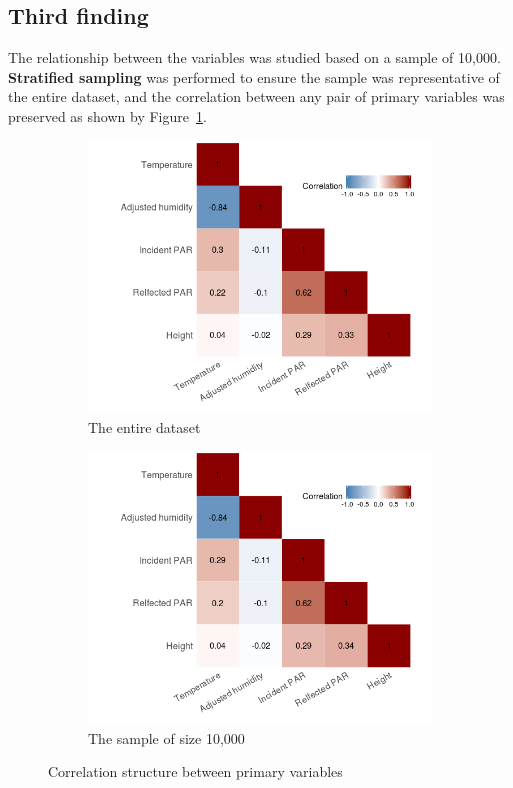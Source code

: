 \documentclass[11pt]{article}
\begin{document}
\subsection{Third finding}
\label{subsec:thirdFind}
The relationship between the variables was studied based on a sample of 10,000. \textbf{Stratified sampling} was performed to ensure the sample was representative of the entire dataset, and the correlation between any pair of primary variables was preserved as shown by Figure~\ref{fig:correlation}.
\begin{figure}[!htb]
\centering
\begin{subfigure}{.5\textwidth}
  \centering
  \includegraphics[width=.8\linewidth]{../figures/corrAll.png}
  \caption{The entire dataset}
\end{subfigure}%
\begin{subfigure}{.5\textwidth}
  \centering
  \includegraphics[width=.8\linewidth]{../figures/corrSample.png}
  \caption{The sample of size 10,000}
\end{subfigure}
\caption{Correlation structure between primary variables}
\label{fig:correlation}
\end{figure}
\end{document}
